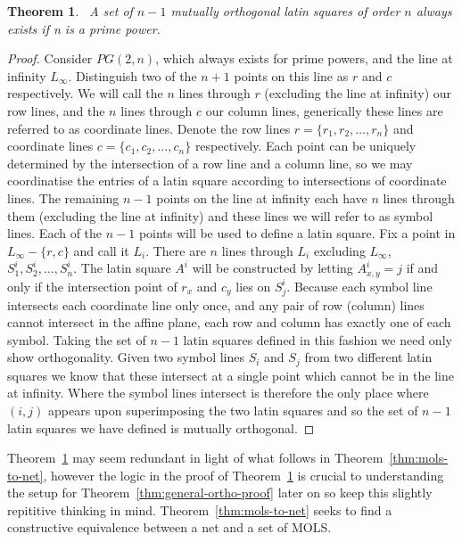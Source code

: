 \documentclass{article}
\newtheorem{theorem}{Theorem}
\begin{document}
\begin{theorem}~\label{thm:mols}
  A set of \(n - 1\) mutually orthogonal latin squares of order \(n\) always exists if n is a prime power.
\end{theorem}
\begin{proof}
  Consider \(PG(2, n)\), which always exists for prime powers, and the line at infinity \(L_{\infty}\). Distinguish two of the \(n + 1\) points on this line as \(r\) and \(c\) respectively.
  We will call the \(n\) lines through \(r\) (excluding the line at infinity) our row lines, and the \(n\) lines through \(c\) our column lines, generically these lines are referred to as coordinate lines. Denote the row lines \(r = \{r_{1}, r_{2}, \ldots, r_{n}\}\) and coordinate lines \(c = \{c_{1}, c_{2}, \ldots, c_{n}\}\) respectively.
  Each point can be uniquely determined by the intersection of a row line and a column line, so we may coordinatise the entries of a latin square according to intersections of coordinate lines.
  The remaining \(n - 1\) points on the line at infinity each have \(n\) lines through them (excluding the line at infinity) and these lines we will refer to as symbol lines. Each of the \(n - 1\) points will be used to define a latin square. Fix a point in \(L_{\infty} - \{r, c\}\) and call it \(L_i\). There are \(n\) lines through \(L_{i}\) excluding \(L_{\infty}\), \(S_{1}^{i}, S_{2}^{i}, \ldots, S^{i}_{n}\).
  The latin square \(A^{i}\) will be constructed by letting \(A^{i}_{x,y} = j\) if and only if the intersection point of \(r_{x}\) and \(c_{y}\) lies on \(S^{i}_{j}\). Because each symbol line intersects each coordinate line only once, and any pair of row (column) lines cannot intersect in the affine plane, each row and column has exactly one of each symbol.
  Taking the set of \(n - 1\) latin squares defined in this fashion we need only show orthogonality. Given two symbol lines \(S_i\) and \(S_j\) from two different latin squares we know that these intersect at a single point which cannot be in the line at infinity.
  Where the symbol lines intersect is therefore the only place where \((i, j)\) appears upon superimposing the two latin squares and so the set of \(n - 1\) latin squares we have defined is mutually orthogonal.
\end{proof}


Theorem~\ref{thm:mols} may seem redundant in light of what follows in Theorem~\ref{thm:mols-to-net}, however the logic in the proof of Theorem~\ref{thm:mols} is crucial to understanding the setup for Theorem~\ref{thm:general-ortho-proof} later on so keep this slightly repititive thinking in mind.
Theorem~\ref{thm:mols-to-net} seeks to find a constructive equivalence between a net and a set of MOLS.
\end{document}
